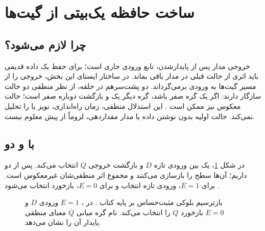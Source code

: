 \section{ساخت حافظه یک‌بیتی از گیت‌ها}
\label{sec:ch1-storage}
\subsection{چرا  لازم می‌شود؟}
خروجی مدار  پس از پایدارشدن، تابع ورودی جاری است؛
برای حفظ یک داده قدیمی باید اثری از حالت قبلی در مدار باقی بماند.
در ساختار ایستای این بخش،  خروجی را از مسیر گیت‌ها به ورودی برمی‌گرداند.
دو  پشت‌سرهم در حلقه، از نظر منطقی دو حالت سازگار دارند:
اگر یک گره صفر باشد، گره دیگر یک و بازگشت دوباره صفر است؛ حالت معکوس نیز ممکن است
\cite[بخش ]{weste}.
این استدلال منطقی، زمان راه‌اندازی، نویز یا  را تحلیل نمی‌کند.
حالت اولیه بدون نوشتن داده یا مدار مقداردهی، لزوماً از پیش معلوم نیست.

\subsection{ با  و دو }
در شکل \ref{fig:ch1-latch}، یک  بین ورودی تازه \(D\) و بازگشت
خروجی \(Q\) انتخاب می‌کند. پس از  دو  داریم؛
آن‌ها سطح را بازسازی می‌کنند و مجموع اثر منطقی‌شان غیرمعکوس است.
برای \(E=1\)، ورودی تازه انتخاب و برای \(E=0\)، بازخورد انتخاب می‌شود
\cite[شکل ]{weste}.

\begin{figure}[ht]
\centering
\begin{latin}
\end{latin}
\caption{بازترسیم بلوکی  مثبت‌حساس بر پایه کتاب \cite{weste}.
در ، \(E=1\) ورودی \(D\) و \(E=0\) بازخورد \(Q\) را انتخاب می‌کند.
نام گره میانی \(\overline{Q}\) معنای منطقی پایدار آن را نشان می‌دهد.}
\label{fig:ch1-latch}
\end{figure}

